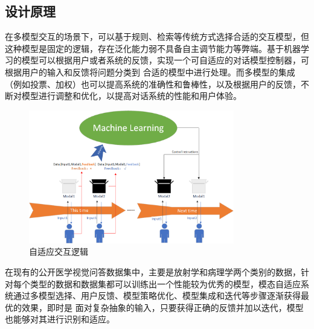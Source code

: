 \subsection{设计原理}
在多模型交互的场景下，可以基于规则、检索等传统方式选择合适的交互模型，但这种模型是固定的逻辑，存在泛化能力弱不具备自主调节能力等弊端。基于机器学习的模型可以根据用户或者系统的反馈，实现一个可自适应的对话模型控制器，可根据用户的输入和反馈将问题分类到
合适的模型中进行处理。而多模型的集成（例如投票、加权）也可以提高系统的准确性和鲁棒性，以及根据用户的反馈，不断对模型进行调整和优化，以提高对话系统的性能和用户体验。

\begin{figure}[htbp]
	\centering	
	\includegraphics[width=0.8\textwidth]{Fig/myfig/chapter5/comu_logit.png}  %
	\caption{\label{comu_logit}自适应交互逻辑} 
\end{figure}

在现有的公开医学视觉问答数据集中，主要是放射学和病理学两个类别的数据，针对每个类型的数据和数据集都可以训练出一个性能较为优秀的模型，模态自适应系统通过多模型选择、用户反馈、模型策略优化、模型集成和迭代等步骤逐渐获得最优的效果，即时是
面对复杂抽象的输入，只要获得正确的反馈并加以迭代，模型也能够对其进行识别和适应。

